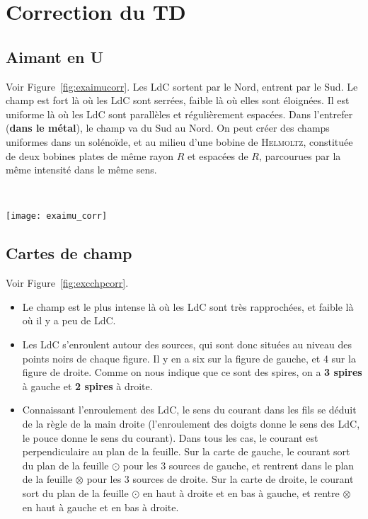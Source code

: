 \documentclass[a4paper, 10pt, final, garamond]{book}
\begin{document}

\chapter{Correction du TD}

\section{Aimant en U}
\label{sec:exaimu}
\noindent
\begin{minipage}[t]{.5\linewidth}
  Voir Figure~\ref{fig:exaimucorr}. Les LdC sortent par le Nord, entrent par le
  Sud. Le champ est fort là où les LdC sont serrées, faible là où elles sont
  éloignées. Il est uniforme là où les LdC sont parallèles et régulièrement
  espacées. Dans l'entrefer (\textbf{dans le métal}), le champ va du Sud au
  Nord.
  \bigbreak
  On peut créer des champs uniformes dans un solénoïde, et au milieu d'une
  bobine de \textsc{Helmoltz}, constituée de deux bobines plates de même rayon
  $R$ et espacées de $R$, parcourues par la même intensité dans le même sens.
\end{minipage}
\begin{minipage}[t]{.5\linewidth}
  ~
  \vspace*{-10pt}
  \begin{center}
    \texttt{[image: exaimu\_corr]}
    \label{fig:exaimucorr}
  \end{center}
\end{minipage}

\section{Cartes de champ}
\label{sec:excchp}
Voir Figure~\ref{fig:excchpcorr}.
\begin{itemize}[label=$\diamond$, leftmargin=10pt]
  \item Le champ est le plus intense là où les LdC sont très rapprochées, et
    faible là où il y a peu de LdC.
  \item Les LdC s'enroulent autour des sources, qui sont donc situées au niveau
    des points noirs de chaque figure. Il y en a six sur la figure de gauche, et
    4 sur la figure de droite. Comme on nous indique que ce sont des spires, on
    a \textbf{3 spires} à gauche et \textbf{2 spires} à droite.
  \item Connaissant l'enroulement des LdC, le sens du courant dans les fils se
    déduit de la règle de la main droite (l'enroulement des doigts donne le sens
    des LdC, le pouce donne le sens du courant). Dans tous les cas, le courant
    est perpendiculaire au plan de la feuille.
    \smallbreak
    Sur la carte de gauche, le courant sort du plan de la feuille $\odot$ pour
    les 3 sources de gauche, et rentrent dans le plan de la feuille $\otimes$
    pour les 3 sources de droite.
    \smallbreak
    Sur la carte de droite, le courant sort du plan de la feuille $\odot$ en haut à
    droite et en bas à gauche, et rentre $\otimes$ en haut à gauche et en bas à
    droite.
\end{itemize}
\end{document}
